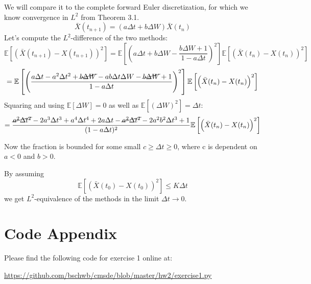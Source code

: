 \documentclass[a4paper,11pt]{scrartcl}
\newcommand*{\Xb}{\bar{X}}
\newcommand*{\D}{\Delta}
\newcommand*{\E}{\mathbb{E}}
\newcommand*{\EV}[1]{\E\left[{#1}\right]}
\newcommand*{\Lt}[1]{\EV{\left({#1}\right)^2}}
\begin{document}
\begin{enumerate}
\begin{enumerate}
  We will compare it to the complete forward Euler discretization, for which we
  know convergence in $L^2$ from Theorem 3.1.
  \[\Xb(t_{n+1}) = (a \D t + b \D W) \Xb(t_n)\]
  Let's compute the $L^2$-difference of the two methods:
  \[\Lt{\Xb(t_{n+1}) - X(t_{n+1})} = \Lt{a \D t + b \D W - \frac{b \D W + 1}{1 - a \D t}}
    \Lt{\Xb(t_{n}) - X(t_n)} \]
  \[ = \Lt{\frac{a \D t - a^2 \D t^2 +\cancel{b \D W} - a b \D t \D W -\cancel{b \D
       W} + 1}{1 - a \D t}}
    \Lt{\Xb(t_{n}) - X(t_n)} \]
  Squaring and using $\EV{\D W} = 0$ as well as $\EV{(\D W)^2} = \D t$:
  \[ = \frac{\cancel{a^2 \D t^2} - 2 a^3 \D t^3 + a^4 \D t^4 +
     2 a \D t -\cancel{a^2 \D t^2} -2 a^2 b^2 \D t^3 + 1}{(1 - a \D t)^2}
     \Lt{\Xb(t_n) - X(t_n)}
  \]

Now the fraction is bounded for some small $c \geq \D t \geq 0$, where c is
dependent on $a < 0$ and $b > 0$.

By assuming \[ \Lt{\Xb(t_0) - X(t_0)} \leq K \D t \]
we get $L^2$-equivalence of the methods in the limit $\D t \rightarrow 0$.
\end{enumerate}
\end{enumerate}

\section*{Code Appendix}
Please find the following code for exercise 1 online at:

\url{https://github.com/bschwb/cmsde/blob/master/hw2/exercise1.py}


\end{document}
